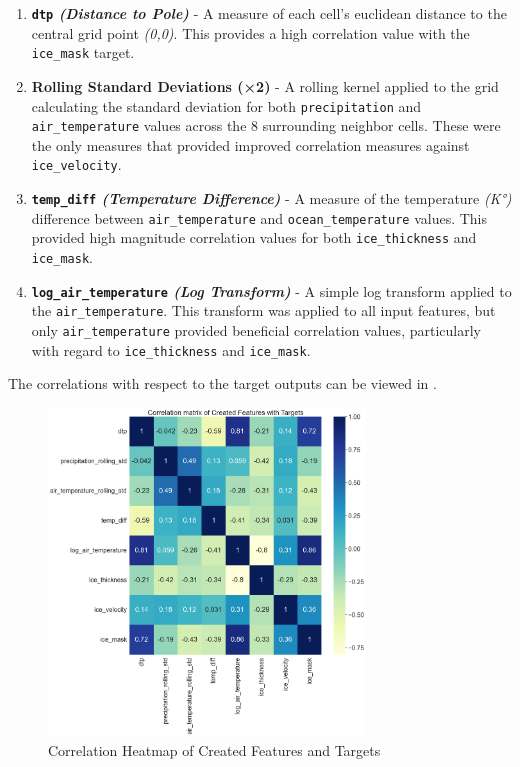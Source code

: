 \begin{enumerate}
    \item \textbf{\texttt{dtp} \textit{(Distance to Pole)}} - A measure of each cell's euclidean distance to the central grid point \textit{(0,0)}. This provides a high correlation value with the \texttt{ice\_mask} target.
    \item \textbf{Rolling Standard Deviations (×2)} - A rolling kernel applied to the grid calculating the standard deviation for both \texttt{precipitation} and \texttt{air\_temperature} values across the 8 surrounding neighbor cells. These were the only measures that provided improved correlation measures against \texttt{ice\_velocity}.
    \item \textbf{\texttt{temp\_diff} \textit{(Temperature Difference)}} - A measure of the temperature \textit{(K°)} difference between \texttt{air\_temperature} and \texttt{ocean\_temperature} values. This provided high magnitude correlation values for both \texttt{ice\_thickness} and \texttt{ice\_mask}.
    \item \textbf{\texttt{log\_air\_temperature} \textit{(Log Transform)}} - A simple log transform applied to the \texttt{air\_temperature}. This transform was applied to all input features, but only \texttt{air\_temperature} provided beneficial correlation values, particularly with regard to \texttt{ice\_thickness} and \texttt{ice\_mask}. 
\end{enumerate}
The correlations with respect to the target outputs can be viewed in .
\begin{figure}[H]
  \centering
  \includegraphics[width=0.75\textwidth]{images/feature_creation_correlations.png}
  \caption{Correlation Heatmap of Created Features and Targets}
  \label{fig:created_feature_correlations}
\end{figure}
